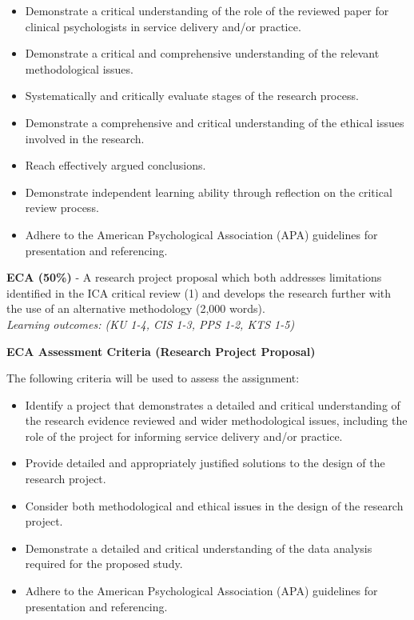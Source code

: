\documentclass[
]{book}
\providecommand{\tightlist}{%
  \setlength{\itemsep}{0pt}\setlength{\parskip}{0pt}}
\begin{document}
\begin{itemize}
\tightlist
\item
  Demonstrate a critical understanding of the role of the reviewed paper for clinical psychologists in service delivery and/or practice.
\item
  Demonstrate a critical and comprehensive understanding of the relevant methodological issues.
\item
  Systematically and critically evaluate stages of the research process.
\item
  Demonstrate a comprehensive and critical understanding of the ethical issues involved in the research.
\item
  Reach effectively argued conclusions.
\item
  Demonstrate independent learning ability through reflection on the critical review process.
\item
  Adhere to the American Psychological Association (APA) guidelines for presentation and referencing.
\end{itemize}

\textbf{ECA (50\%)} - A research project proposal which both addresses limitations identified in the ICA critical review (1) and develops the research further with the use of an alternative methodology (2,000 words).\\
\emph{Learning outcomes: (KU 1-4, CIS 1-3, PPS 1-2, KTS 1-5)}

\textbf{ECA Assessment Criteria (Research Project Proposal)}

The following criteria will be used to assess the assignment:

\begin{itemize}
\tightlist
\item
  Identify a project that demonstrates a detailed and critical understanding of the research evidence reviewed and wider methodological issues, including the role of the project for informing service delivery and/or practice.
\item
  Provide detailed and appropriately justified solutions to the design of the research project.
\item
  Consider both methodological and ethical issues in the design of the research project.
\item
  Demonstrate a detailed and critical understanding of the data analysis required for the proposed study.
\item
  Adhere to the American Psychological Association (APA) guidelines for presentation and referencing.
\end{itemize}
\end{document}
